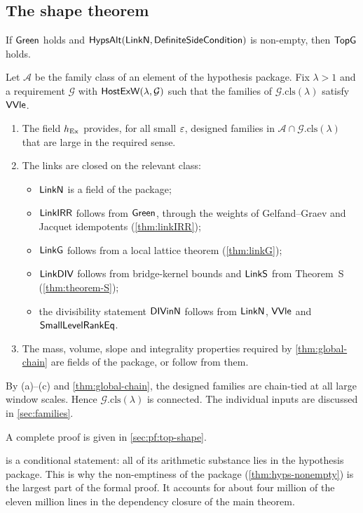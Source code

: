 \subsection{The shape theorem}

\begin{theorem}\Fmark\label{thm:shape}
If $\mathsf{Green}$ holds and $\mathsf{HypsAlt}(\mathsf{LinkN},\mathsf{DefiniteSideCondition})$ is
non-empty, then $\mathsf{TopG}$ holds.
\end{theorem}

\begin{proofoutline}
Let $\mathcal A$ be the family class of an element of the hypothesis package. Fix $\lambda>1$ and a
requirement $\mathcal G$ with $\mathsf{HostExW}(\lambda,\mathcal G)$ such that the families of
$\mathcal G.\mathrm{cls}(\lambda)$ satisfy $\mathsf{VVle}$.
\begin{enumerate}[label=(\alph*)]
\item The field $h_{\rm Ex}$ provides, for all small $\varepsilon$, designed families in
$\mathcal A\cap\mathcal G.\mathrm{cls}(\lambda)$ that are large in the required sense.
\item The links are closed on the relevant class:
  \begin{itemize}
  \item $\mathsf{LinkN}$ is a field of the package;
  \item $\mathsf{LinkIRR}$ follows from $\mathsf{Green}$, through the weights of Gelfand--Graev and
  Jacquet idempotents (\cref{thm:linkIRR});
  \item $\mathsf{LinkG}$ follows from a local lattice theorem (\cref{thm:linkG});
  \item $\mathsf{LinkDIV}$ follows from bridge-kernel bounds and $\mathsf{LinkS}$ from Theorem~S
  (\cref{thm:theorem-S});
  \item the divisibility statement $\mathsf{DIVinN}$ follows from $\mathsf{LinkN}$, $\mathsf{VVle}$ and
  $\mathsf{SmallLevelRankEq}$.
  \end{itemize}
\item The mass, volume, slope and integrality properties required by \cref{thm:global-chain} are
fields of the package, or follow from them.
\end{enumerate}
By (a)--(c) and \cref{thm:global-chain}, the designed families are chain-tied at all large window
scales. Hence $\mathcal G.\mathrm{cls}(\lambda)$ is connected. The individual inputs are discussed in
\cref{sec:families}.

A complete proof is given in \cref{sec:pf:top-shape}.
\end{proofoutline}

\begin{remark}
 is a conditional statement: all of its arithmetic substance lies in the hypothesis
package. This is why the non-emptiness of the package (\cref{thm:hyps-nonempty}) is the largest part
of the formal proof. It accounts for about four million of the eleven million lines in the
dependency closure of the main theorem.
\end{remark}
